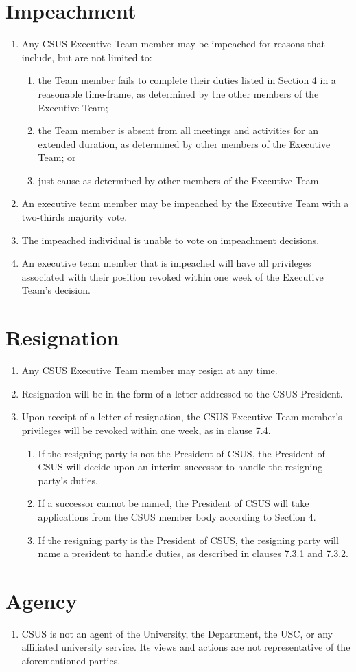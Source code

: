 \documentclass{article}
\begin{document}
\section{Impeachment}
\begin{enumerate}
	\item Any CSUS Executive Team member may be impeached for reasons that include, but are not limited to:
	\begin{enumerate}
		\item the Team member fails to complete their duties listed in Section 4 in a reasonable time-frame, as determined by the other members of the Executive Team;
		\item the Team member is absent from all meetings and activities for an extended duration, as determined by other members of the Executive Team; or
		\item just cause as determined by other members of the Executive Team.
	\end{enumerate}
	\item An executive team member may be impeached by the Executive Team with a two-thirds majority vote.
	\item The impeached individual is unable to vote on impeachment decisions.
	\item An executive team member that is impeached will have all privileges associated with their position revoked within one week of the Executive Team's decision.
\end{enumerate}

\section{Resignation}
\begin{enumerate}
	\item Any CSUS Executive Team member may resign at any time.
	\item Resignation will be in the form of a letter addressed to the CSUS President.
	\item Upon receipt of a letter of resignation, the CSUS Executive Team member's privileges will be revoked within one week, as in clause 7.4.
	\begin{enumerate}
		\item If the resigning party is not the President of CSUS, the President of CSUS will decide upon an interim successor to handle the resigning party's duties.
		\item If a successor cannot be named, the President of CSUS will take applications from the CSUS member body according to Section 4.
		\item If the resigning party is the President of CSUS, the resigning party will name a president to handle duties, as described in clauses 7.3.1 and 7.3.2.
	\end{enumerate}
\end{enumerate}

\section{Agency}
\begin{enumerate}
	\item CSUS is not an agent of the University, the Department, the USC, or any affiliated university service. Its views and actions are not representative of the aforementioned parties.
\end{enumerate}
\end{document}
